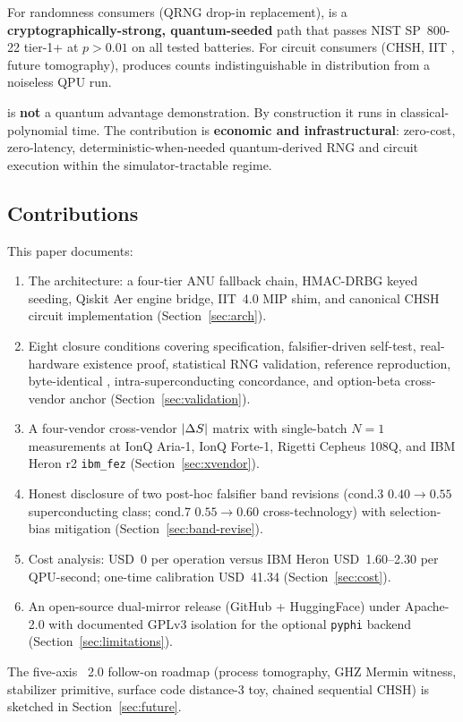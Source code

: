 For randomness consumers (QRNG drop-in replacement), \qmirror{} is a
\textbf{cryptographically-strong, quantum-seeded} path that passes
NIST SP~800-22 tier-1+ at $p > 0.01$ on all tested batteries. For
circuit consumers (CHSH, IIT \phistar, future tomography), \qmirror{}
produces counts indistinguishable in distribution from a noiseless QPU
run.

\qmirror{} is \textbf{not} a quantum advantage demonstration. By
construction it runs in classical-polynomial time. The contribution
is \textbf{economic and infrastructural}: zero-cost, zero-latency,
deterministic-when-needed quantum-derived RNG and circuit execution
within the simulator-tractable regime.

\subsection{Contributions}

This paper documents:

\begin{enumerate}
\item The \qmirror{} architecture: a four-tier ANU fallback chain,
  HMAC-DRBG keyed seeding, Qiskit Aer engine bridge, IIT~4.0 \phistar{}
  MIP shim, and canonical CHSH circuit implementation
  (Section~\ref{sec:arch}).
\item Eight closure conditions covering specification, falsifier-driven
  self-test, real-hardware existence proof, statistical RNG validation,
  reference reproduction, byte-identical \phistar, intra-superconducting
  concordance, and option-beta cross-vendor anchor
  (Section~\ref{sec:validation}).
\item A four-vendor cross-vendor $\lvert\Delta S\rvert$ matrix with single-batch
  $N=1$ measurements at IonQ Aria-1, IonQ Forte-1, Rigetti Cepheus
  108Q, and IBM Heron r2 \texttt{ibm\_fez}
  (Section~\ref{sec:xvendor}).
\item Honest disclosure of two post-hoc falsifier band revisions
  (cond.3 $0.40 \rightarrow 0.55$ superconducting class; cond.7
  $0.55 \rightarrow 0.60$ cross-technology) with selection-bias
  mitigation (Section~\ref{sec:band-revise}).
\item Cost analysis: USD~0 per operation versus IBM Heron USD~1.60--2.30
  per QPU-second; one-time calibration USD~41.34
  (Section~\ref{sec:cost}).
\item An open-source dual-mirror release (GitHub + HuggingFace) under
  Apache-2.0 with documented GPLv3 isolation for the optional
  \texttt{pyphi} backend (Section~\ref{sec:limitations}).
\end{enumerate}

The five-axis \qmirror{}~2.0 follow-on roadmap (process tomography,
GHZ Mermin witness, stabilizer primitive, surface code distance-3 toy,
chained sequential CHSH) is sketched in Section~\ref{sec:future}.
